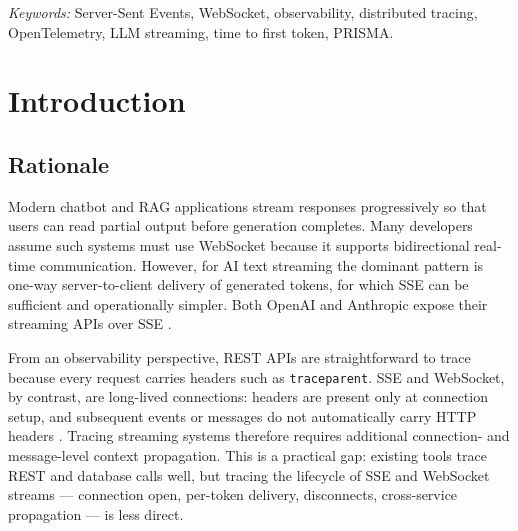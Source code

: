 \documentclass[11pt]{article}
\begin{document}
\begin{abstract}
per configuration), corroborates transport parity (H3) on a completely different stack and reproduces --- more strongly --- the same real-LLM output-length confound on content-loss measurement identified in the Ollama cross-check, directly addressing this paper's own future-work call for additional models. A fourth, separate experiment validates the framework's active-connections gauge under 50-way concurrent load for both protocols. We close by discussing where the unified model is the wrong choice --- per-message spans, not span events, are required when an individual message must anchor a distributed trace of its own --- and by noting that neither protocol currently gives a client any way to detect a silently dropped token, an observability gap this work surfaces rather than resolves.
\end{abstract}

\textit{Keywords:} Server-Sent Events, WebSocket, observability, distributed tracing, OpenTelemetry, LLM streaming, time to first token, PRISMA.

\section{Introduction}

\subsection{Rationale}
Modern chatbot and RAG applications stream responses progressively so that users can read partial output before generation completes. Many developers assume such systems must use WebSocket because it supports bidirectional real-time communication. However, for AI text streaming the dominant pattern is one-way server-to-client delivery of generated tokens, for which SSE can be sufficient and operationally simpler. Both OpenAI and Anthropic expose their streaming APIs over SSE \cite{buildmvpfast2026,procedure2026}.

From an observability perspective, REST APIs are straightforward to trace because every request carries headers such as \texttt{traceparent}. SSE and WebSocket, by contrast, are long-lived connections: headers are present only at connection setup, and subsequent events or messages do not automatically carry HTTP headers \cite{w3ctrace,oneuptimews2026}. Tracing streaming systems therefore requires additional connection- and message-level context propagation. This is a practical gap: existing tools trace REST and database calls well, but tracing the lifecycle of SSE and WebSocket streams --- connection open, per-token delivery, disconnects, cross-service propagation --- is less direct.
\end{document}
